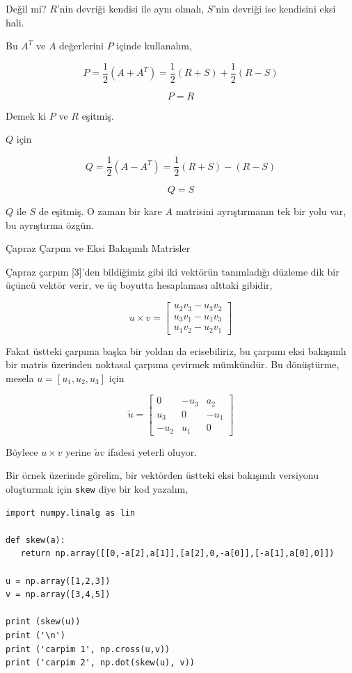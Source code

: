 \documentclass[12pt,fleqn]{article}\usepackage{../../common}
\begin{document}
Değil mi? $R$'nin devriği kendisi ile aynı olmalı, $S$'nin devriği ise
kendisini eksi hali.

Bu $A^T$ ve $A$ değerlerini $P$ içinde kullanalım,

$$
P = \frac{1}{2} (A + A^T) = \frac{1}{2} (R + S) + \frac{1}{2} (R - S)
$$

$$
P = R
$$

Demek ki $P$ ve $R$ eşitmiş.

$Q$ için

$$
Q = \frac{1}{2} (A-A^T) = \frac{1}{2} (R+S) - (R-S) 
$$

$$
Q = S
$$

$Q$ ile $S$ de eşitmiş. O zaman bir kare $A$ matrisini ayrıştırmanın tek bir
yolu var, bu ayrıştırma özgün.

Çapraz Çarpım ve Eksi Bakışımlı Matrisler

Çapraz çarpım [3]'den bildiğimiz gibi iki vektörün tanımladığı düzleme dik bir
üçüncü vektör verir, ve üç boyutta hesaplaması alttaki gibidir,

$$ 
u \times v = 
\left[\begin{array}{c}
u_2v_3 - u_3v_2 \\
u_3v_1 - u_1v_3 \\
u_1v_2 - u_2v_1 
\end{array}\right]
$$

Fakat üstteki çarpıma başka bir yoldan da erisebiliriz, bu çarpımı eksi
bakışımlı bir matris üzerinden noktasal çarpıma çevirmek mümkündür. Bu
dönüştürme, mesela $u = [u_1, u_2, u_3]$ için

$$
\tilde u =
\left[\begin{array}{ccc}
0 & -u_3 & a_2 \\
u_3 & 0 & -u_1 \\
-u_2 & u_1 & 0
\end{array}\right]
$$

Böylece $u \times v$ yerine $\tilde u v$ ifadesi yeterli oluyor.

Bir örnek üzerinde görelim, bir vektörden üstteki eksi bakışımlı versiyonu
oluşturmak için \verb!skew! diye bir kod yazalım,

\begin{verbatim}
import numpy.linalg as lin
  
def skew(a):
   return np.array([[0,-a[2],a[1]],[a[2],0,-a[0]],[-a[1],a[0],0]])

u = np.array([1,2,3])
v = np.array([3,4,5])

print (skew(u))
print ('\n')
print ('carpim 1', np.cross(u,v))
print ('carpim 2', np.dot(skew(u), v))
\end{verbatim}
\end{document}
